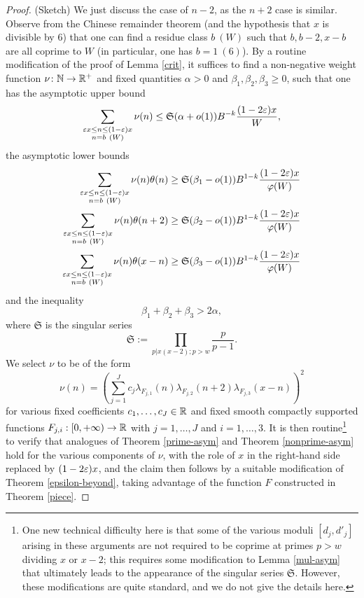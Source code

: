 \begin{proof} (Sketch) We just discuss the case of $n-2$, as the $n+2$ case is similar. Observe from the Chinese remainder theorem (and the hypothesis that $x$ is divisible by $6$) that one can find a residue class $b\ (W)$ such that $b, b-2, x-b$ are all coprime to $W$ (in particular, one has $b=1\ (6)$).   By a routine modification of the proof of Lemma \ref{crit}, it suffices to  find a non-negative weight
  function $\nu \colon \mathbb{N} \to \mathbb{R}^+$ and fixed quantities $\alpha > 0$ and $\beta_1,\beta_2,\beta_3 \geq
  0$, such that one has the
  asymptotic upper bound
$$
 \sum_{\substack{\varepsilon x \leq n \leq (1-\varepsilon) x\\ n = b\ (W)}} \nu(n) \leq {\mathfrak S} (\alpha+o(1)) B^{-k} \frac{(1-2\varepsilon) x}{W},
$$
the asymptotic lower bounds
\begin{align*}
  \sum_{\substack{\varepsilon x \leq n \leq (1-\varepsilon) x\\ n = b\ (W)}} \nu(n) \theta(n) &\geq {\mathfrak S} (\beta_1-o(1)) B^{1-k} \frac{(1-2\varepsilon) x}{\varphi(W)} \\
  \sum_{\substack{\varepsilon x \leq n \leq (1-\varepsilon) x\\ n = b\ (W)}} \nu(n) \theta(n+2) &\geq {\mathfrak S} (\beta_2-o(1)) B^{1-k} \frac{(1-2\varepsilon) x}{\varphi(W)} \\
  \sum_{\substack{\varepsilon x \leq n \leq (1-\varepsilon) x\\ n = b\ (W)}} \nu(n) \theta(x-n) &\geq {\mathfrak S} (\beta_3-o(1)) B^{1-k} \frac{(1-2\varepsilon) x}{\varphi(W)} 
\end{align*}
and the inequality
$$ \beta_1+\beta_2+\beta_3 > 2 \alpha,$$
where ${\mathfrak S}$ is the singular series
$$ {\mathfrak S} := \prod_{p|x(x-2); p > w} \frac{p}{p-1}.$$
We select $\nu$ to be of the form
$$ \nu(n) = \left( \sum_{j=1}^J c_j \lambda_{F_{j,1}}(n) \lambda_{F_{j,2}}(n+2) \lambda_{F_{j,3}}(x-n) \right)^2 $$
for various fixed coefficients $c_1,\dots,c_J \in \mathbb{R}$ and fixed smooth compactly supported functions $F_{j,i}: [0,+\infty) \to \mathbb{R}$ with $j=1,\dots,J$ and $i=1,\dots,3$.  It is then routine\footnote{One new technical difficulty here is that some of the various moduli $[d_j,d'_j]$ arising in these arguments are not required to be coprime at primes $p > w$ dividing $x$ or $x-2$; this requires some modification to Lemma \ref{mul-asym} that ultimately leads to the appearance of the singular series ${\mathfrak S}$.  However, these modifications are quite standard, and we do not give the details here.} to verify that analogues of Theorem \ref{prime-asym} and Theorem \ref{nonprime-asym} hold for the various components of $\nu$, with the role of $x$ in the right-hand side replaced by $(1-2\varepsilon) x$, and the claim then follows by a suitable modification of Theorem \ref{epsilon-beyond}, taking advantage of the function $F$ constructed in Theorem \ref{piece}.
\end{proof}

